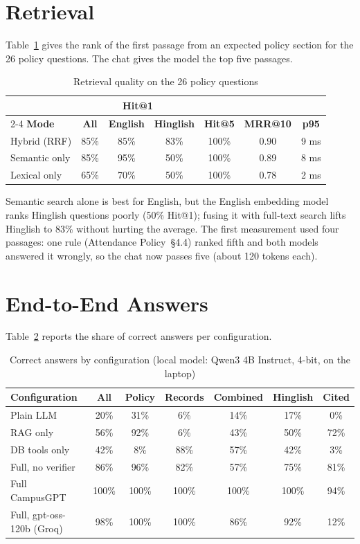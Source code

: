 \documentclass[11pt,a4paper,oneside]{report}
\begin{document}
\section{Retrieval}
Table~\ref{tab:retrieval} gives the rank of the first passage from an expected policy
section for the 26 policy questions. The chat gives the model the top five passages.

\begin{table}[H]
\centering
\caption{Retrieval quality on the 26 policy questions}
\label{tab:retrieval}
\begin{tabular}{@{}lcccccc@{}}
\toprule
& \multicolumn{3}{c}{\textbf{Hit@1}} & & &\\
\cmidrule(lr){2-4}
\textbf{Mode} & \textbf{All} & \textbf{English} & \textbf{Hinglish} & \textbf{Hit@5} &
\textbf{MRR@10} & \textbf{p95}\\
\midrule
Hybrid (RRF) & 85\% & 85\% & 83\% & 100\% & 0.90 & 9 ms\\
Semantic only & 85\% & 95\% & 50\% & 100\% & 0.89 & 8 ms\\
Lexical only & 65\% & 70\% & 50\% & 100\% & 0.78 & 2 ms\\
\bottomrule
\end{tabular}
\end{table}

Semantic search alone is best for English, but the English embedding model ranks Hinglish
questions poorly (50\% Hit@1); fusing it with full-text search lifts Hinglish to 83\%
without hurting the average. The first measurement used four passages: one rule (Attendance
Policy~\S4.4) ranked fifth and both models answered it wrongly, so the chat now passes five
(about 120 tokens each).

\section{End-to-End Answers}
Table~\ref{tab:chat} reports the share of correct answers per configuration.

\begin{table}[H]
\centering
\caption{Correct answers by configuration (local model: Qwen3 4B Instruct, 4-bit, on the laptop)}
\label{tab:chat}
\begin{tabular}{@{}lcccccc@{}}
\toprule
\textbf{Configuration} & \textbf{All} & \textbf{Policy} & \textbf{Records} &
\textbf{Combined} & \textbf{Hinglish} & \textbf{Cited}\\
\midrule
Plain LLM & 20\% & 31\% & 6\% & 14\% & 17\% & 0\%\\
RAG only & 56\% & 92\% & 6\% & 43\% & 50\% & 72\%\\
DB tools only & 42\% & 8\% & 88\% & 57\% & 42\% & 3\%\\
Full, no verifier & 86\% & 96\% & 82\% & 57\% & 75\% & 81\%\\
Full CampusGPT & 100\% & 100\% & 100\% & 100\% & 100\% & 94\%\\
\midrule
Full, gpt-oss-120b (Groq) & 98\% & 100\% & 100\% & 86\% & 92\% & 12\%\\
\bottomrule
\end{tabular}
\end{table}
\end{document}
